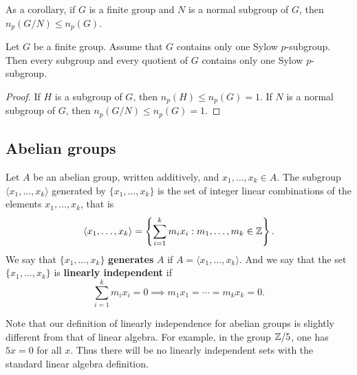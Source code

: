 As a corollary, if $G$ is a finite group and
$N$ is a normal subgroup of $G$, then 
$n_p(G/N)\leq n_p(G)$.

\begin{corollary}
Let $G$ be a finite group. Assume that 
$G$ contains only one Sylow $p$-subgroup. Then
every subgroup and every quotient of 
$G$ 
contains only one Sylow 
$p$-subgroup. 
\end{corollary}

\begin{proof}
    If $H$ is a subgroup of $G$, then
    $n_p(H)\leq n_p(G)=1$. If $N$ is a normal subgroup of 
    $G$, then $n_p(G/N)\leq n_p(G)=1$.
\end{proof}

%
%

\subsection{Abelian groups}

Let $A$ be an abelian group, written additively, and $x_1,\dots,x_k\in A$. 
The subgroup $\langle x_1,\dots,x_k\rangle$ 
generated by $\{x_1,\dots,x_k\}$
is the set of integer linear combinations of the elements 
$x_1,\dots,x_k$, that is
\[ 
\langle x_1,\dots,x_k\rangle=\left\{ 
\sum_{i=1}^k m_ix_i: m_1,\dots,m_k\in\mathbb{Z}\right\}.
\]
We say that $\{x_1,\dots,x_k\}$ \textbf{generates} $A$ if 
$A=\langle x_1,\dots,x_k\rangle$. And we say that the set 
$\{x_1,\dots,x_k\}$ is 
\textbf{linearly independent} if 
\[
\sum_{i=1}^k m_ix_i=0\implies m_1x_1=\cdots=m_kx_k=0.
\]

Note that our definition of linearly independence for abelian groups is slightly 
different from that of linear algebra. For example, in the group $\mathbb{Z}/5$, 
one has $5x=0$ for all $x$. Thus there will be no linearly independent sets with 
the standard linear algebra definition. 

